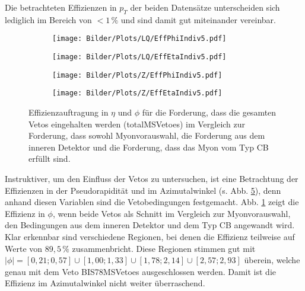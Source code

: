 Die betrachteten Effizienzen in $p_T$ der beiden Datensätze unterscheiden sich lediglich im Bereich von $<1\,\%$ und sind damit gut miteinander vereinbar.\\ 
\begin{figure}
  \begin{subfigure}[t]{0.55\textwidth}
  \texttt{[image: Bilder/Plots/LQ/EffPhiIndiv5.pdf]}
  \label{PhiIndiv5LQ}
  \end{subfigure}
\begin{subfigure}[t]{0.55\textwidth}
 \texttt{[image: Bilder/Plots/LQ/EffEtaIndiv5.pdf]}
  \label{EtaIndiv5LQ}
\end{subfigure}
\begin{subfigure}[t]{0.55\textwidth}
  \texttt{[image: Bilder/Plots/Z/EffPhiIndiv5.pdf]}
  \label{PhiIndiv5Z}
\end{subfigure}
\begin{subfigure}[t]{0.55\textwidth}
  \texttt{[image: Bilder/Plots/Z/EffEtaIndiv5.pdf]}
  \label{EtaIndiv5Z}
\end{subfigure}
\caption{Effizienzauftragung in $\eta$ und $\phi$ für die Forderung, dass die gesamten Vetos eingehalten werden (totalMSVetoes) im Vergleich zur Forderung, dass sowohl Myonvorauswahl, die Forderung aus dem inneren Detektor und die Forderung, dass das Myon vom Typ CB erfüllt sind.}
\label{EffPhiEtaIndiv5}
\end{figure} 
Instruktiver, um den Einfluss der Vetos zu untersuchen, ist eine Betrachtung der Effizienzen in der Pseudorapidität und im Azimutalwinkel (s. Abb. \ref{EffPhiEtaIndiv5}), denn anhand diesen Variablen sind die Vetobedingungen festgemacht. Abb. \ref{PhiIndiv5LQ} zeigt die Effizienz in $\phi$, wenn beide Vetos als Schnitt im Vergleich zur Myonvorauswahl, den Bedingungen aus dem inneren Detektor und dem Typ CB angewandt wird. Klar erkennbar sind verschiedene Regionen, bei denen die Effizienz teilweise auf Werte von $89,5\,\%$ zusammenbricht. Diese Regionen stimmen gut mit $|\phi|=[0,21;0,57]\cup[1,00;1,33]\cup[1,78;2,14]\cup[2,57;2,93]$ überein, welche genau mit dem Veto BIS78MSVetoes ausgeschlossen werden. Damit ist die Effizienz im Azimutalwinkel nicht weiter überraschend.\\

